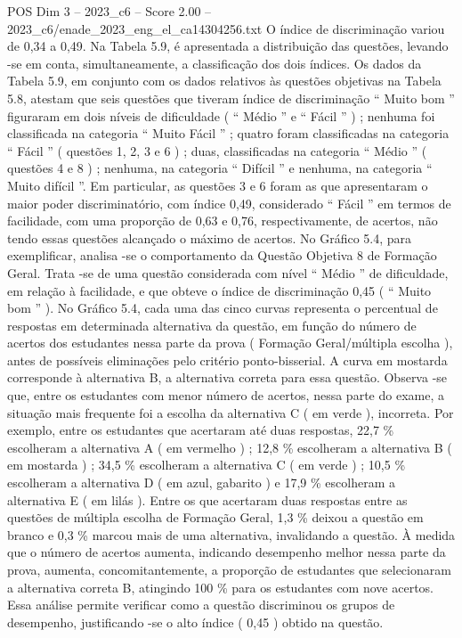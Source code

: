 \begin{textsample}{POS Dim 3 – 2023\_c6 – Score 2.00 – 2023\_c6/enade\_2023\_eng\_el\_ca14304256.txt}
O índice de discriminação variou de 0,34 a 0,49.
Na Tabela 5.9, é apresentada a distribuição das questões, levando -se em conta, simultaneamente, a classificação dos dois índices.
Os dados da Tabela 5.9, em conjunto com os dados relativos às questões objetivas na Tabela 5.8, atestam que seis questões que tiveram índice de discriminação “ Muito bom ” figuraram em dois níveis de dificuldade ( “ Médio ” e “ Fácil ” ) ; nenhuma foi classificada na categoria “ Muito Fácil ” ; quatro foram classificadas na categoria “ Fácil ” ( questões 1, 2, 3 e 6 ) ; duas, classificadas na categoria “ Médio ” ( questões 4 e 8 ) ; nenhuma, na categoria “ Difícil ” e nenhuma, na categoria “ Muito difícil ”.
Em particular, as questões 3 e 6 foram as que apresentaram o maior poder discriminatório, com índice 0,49, considerado “ Fácil ” em termos de facilidade, com uma proporção de 0,63 e 0,76, respectivamente, de acertos, não tendo essas questões alcançado o máximo de acertos.
No Gráfico 5.4, para exemplificar, analisa -se o comportamento da Questão Objetiva 8 de Formação Geral.
Trata -se de uma questão considerada com nível “ Médio ” de dificuldade, em relação à facilidade, e que obteve o índice de discriminação 0,45 ( “ Muito bom ” ).
No Gráfico 5.4, cada uma das cinco curvas representa o percentual de respostas em determinada alternativa da questão, em função do número de acertos dos estudantes nessa parte da prova ( Formação Geral/múltipla escolha ), antes de possíveis eliminações pelo critério ponto-bisserial.
A curva em mostarda corresponde à alternativa B, a alternativa correta para essa questão.
Observa -se que, entre os estudantes com menor número de acertos, nessa parte do exame, a situação mais frequente foi a escolha da alternativa C ( em verde ), incorreta.
Por exemplo, entre os estudantes que acertaram até duas respostas, 22,7 \% escolheram a alternativa A ( em vermelho ) ; 12,8 \% escolheram a alternativa B ( em mostarda ) ; 34,5 \% escolheram a alternativa C ( em verde ) ; 10,5 \% escolheram a alternativa D ( em azul, gabarito ) e 17,9 \% escolheram a alternativa E ( em lilás ).
Entre os que acertaram duas respostas entre as questões de múltipla escolha de Formação Geral, 1,3 \% deixou a questão em branco e 0,3 \% marcou mais de uma alternativa, invalidando a questão.
À medida que o número de acertos aumenta, indicando desempenho melhor nessa parte da prova, aumenta, concomitantemente, a proporção de estudantes que selecionaram a alternativa correta B, atingindo 100 \% para os estudantes com nove acertos.
Essa análise permite verificar como a questão discriminou os grupos de desempenho, justificando -se o alto índice ( 0,45 ) obtido na questão.

\end{textsample}
